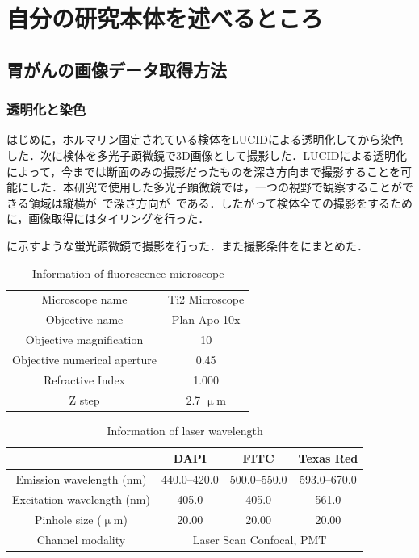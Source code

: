 \chapter{自分の研究本体を述べるところ}

\section{胃がんの画像データ取得方法}

\subsection{透明化と染色}
はじめに，ホルマリン固定されている検体をLUCIDによる透明化してから染色した．次に検体を多光子顕微鏡で3D画像として撮影した．LUCIDによる透明化によって，今までは断面のみの撮影だったものを深さ方向まで撮影することを可能にした．本研究で使用した多光子顕微鏡では，一つの視野で観察することができる領域は縦横が~で深さ方向が~である．したがって検体全ての撮影をするために，画像取得にはタイリングを行った．

に示すような蛍光顕微鏡で撮影を行った．また撮影条件をにまとめた．

\begin{table}[H]
	\centering
	\caption{Information of fluorescence microscope}
	\label{tab:蛍光顕微鏡}
	\begin{tabular}{cc}\toprule
		Microscope name & Ti2 Microscope \\ 
		Objective name & Plan Apo 10x \\ 
		Objective magnification & 10 \\ 
		Objective numerical aperture & 0.45 \\ 
		Refractive Index & 1.000 \\
		Z step & 2.7 $\upmu$m \\ \bottomrule
	\end{tabular} 
\end{table}

\begin{table}[H]
	\centering
	\caption{Information of laser wavelength}
	\label{tab:レーザー波長}
	\begin{tabular}{cccc}\toprule
		& DAPI & FITC & Texas Red \\ \midrule
		Emission wavelength (nm) & 440.0--420.0 & 500.0--550.0 & 593.0--670.0 \\ 
		Excitation wavelength (nm) & 405.0 & 405.0 & 561.0 \\ 
		Pinhole size ($\upmu$m) & 20.00 & 20.00 & 20.00 \\ 
		Channel modality & \multicolumn{3}{c}{Laser Scan Confocal, PMT } \\ \bottomrule
	\end{tabular}
\end{table}

